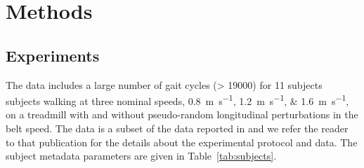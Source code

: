 \documentclass{article}
\begin{document}
\section*{Methods}
%
\subsection*{Experiments}
%
The data includes a large number of gait cycles (> 19000) for 11 subjects
subjects walking at three nominal speeds,
\SIlist{0.8;1.2;1.6}{\meter\per\second}, on a treadmill with and without
pseudo-random longitudinal perturbations in the belt speed.
The data is a subset of the data reported in \cite{Moore2015} and we refer the
reader to that publication for the details about the experimental protocol and
data. The subject metadata parameters are given in Table~\ref{tab:subjects}.
%
\begin{table}
  \cprotect\caption{Information about the 11 study participants. The final
    three columns provide the trial numbers associated with each nominal
    treadmill speed. The measured mass is computed from the mean total vertical
    ground reaction force just after the calibration pose event. Generated by
    \verb|src/subject_table.py|.}
  \centering
  
  \label{tab:subjects}
\end{table}
\end{document}
